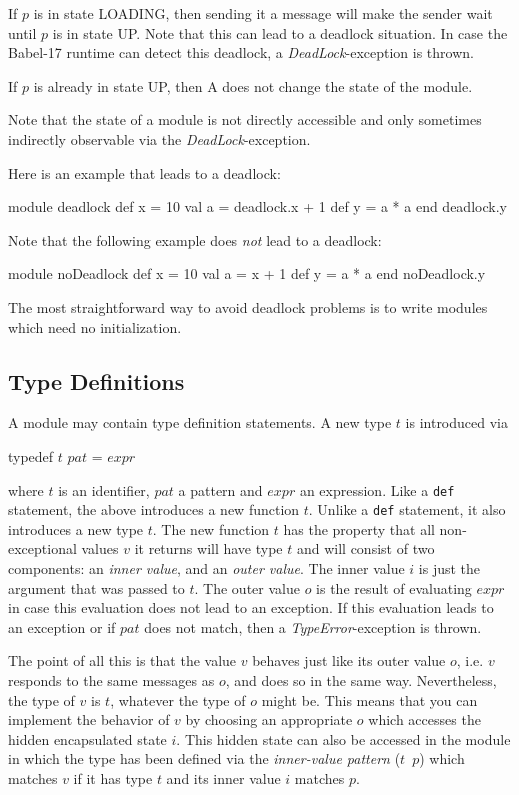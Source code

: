 \documentclass[11pt]{amsart}
\newcommand{\babelsrc}[1] {\lstinline!#1!}
\begin{document}
If $p$ is in state LOADING, then sending it a message will make the sender wait until $p$ is in state UP. Note that this can lead to a deadlock situation. In case the Babel-17 runtime can detect this deadlock, a \emph{DeadLock}-exception is thrown. 

If $p$ is already in state UP, then A does not change the state of the module. 

Note that the state of a module is not directly accessible and only sometimes indirectly observable via the \emph{DeadLock}-exception.

Here is an example that leads to a deadlock:
\begin{babellisting}
module deadlock
  def x = 10
  val a = deadlock.x + 1
  def y = a * a
end
deadlock.y
\end{babellisting}
Note that the following example does \emph{not} lead to a deadlock:
\begin{babellisting}
module noDeadlock
  def x  = 10
  val a = x + 1
  def y = a * a
end
noDeadlock.y
\end{babellisting}
The most straightforward way to avoid deadlock problems is to write modules which need no initialization. 

\subsection{Type Definitions}\label{sec:typedefs}
A module may contain type definition statements. A new type $t$ is introduced via
\begin{babellisting}
typedef $t$ $pat$ = $expr$
\end{babellisting}
where $t$ is an identifier, $pat$ a pattern and $expr$ an expression. Like a \babelsrc{def} statement, the above introduces a new function $t$. Unlike a \babelsrc{def} statement, it also introduces a new type $t$. The new function $t$ has the property that all non-exceptional values $v$ it returns will have type $t$ and will consist of two components: an \emph{inner value}, and an \emph{outer value}. The inner value $i$ is just the argument that was passed to $t$. The outer value $o$ is the result of evaluating $expr$ in case this evaluation does not lead to an exception. If this evaluation leads to an exception or if $pat$ does not match, then a \emph{TypeError}-exception is thrown. 

The point of all this is that the value $v$ behaves just like its outer value $o$, i.e. $v$ responds to the same messages as $o$, and does so in the same way. Nevertheless, the type of $v$ is $t$, whatever the type of $o$ might be. This means that you can implement the behavior of $v$ by choosing an appropriate $o$ which accesses the hidden encapsulated state $i$. This hidden state can also be accessed in the module in which the type has been defined via the \emph{inner-value pattern} ($t$\ $p$) which matches $v$ if it has type $t$ and its inner value $i$ matches $p$.
\end{document}
